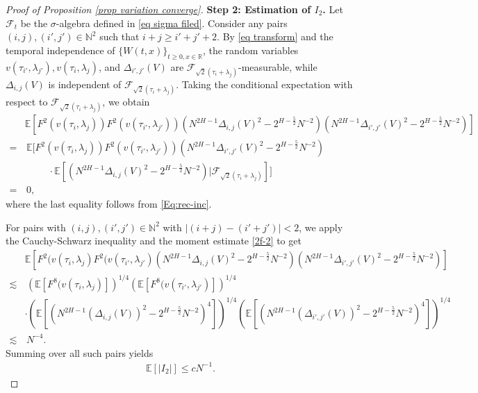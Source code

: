 \documentclass[11pt,reqno]{amsart}
\numberwithin{equation}{section}
\newcommand{\1}{{\bf 1}}
\newcommand{\2}{{\bf 2}}
\begin{document}
\begin{proof} [Proof of Proposition \ref{prop variation converge}]
\noindent\textbf{Step 2:  Estimation of  $I_2$.}
      Let $ \mathcal F_t$ be the   $\sigma$-algebra defined in \eqref{eq sigma filed}.  Consider any pairs $(i, j), (i', j')\in \mathbb N^2$  such that  $i+j\ge i'+j'+2$. By \eqref{eq transform} and  the temporal independence of  $\{W(t, x)\}_{t\ge0, x\in\mathbb R}$,    the random variables    $v(\tau_{i'}, \lambda_{j'}), v(\tau_i, \lambda_j)$,  and $\Delta_{i',j'}(V)$ are  $\mathcal F_{\sqrt{2}(\tau_i+\lambda_j)}$-measurable,   while  $\Delta_{i,j}(V)$   is independent of   $\mathcal F_{\sqrt{2}(\tau_i+\lambda_j)}$. Taking the conditional expectation with respect to    $\mathcal F_{\sqrt{2}(\tau_i+\lambda_j)}$, we obtain
    \begin{align*}
  & \mathbb E\left[   F^2(v(\tau_i, \lambda_j) )  F^2(v(\tau_{i'}, \lambda_{j'})) \left( N^{2H-1} \Delta_{i,j}(V)^2   -2^{H-\frac{5}{2}}N^{-2}\right)   \left( N^{2H-1}  \Delta_{i',j'}(V)^2   -2^{H-\frac{5}{2}}N^{-2}\right) \right]\\
   =&\, \mathbb E\Bigg[   F^2(v(\tau_i, \lambda_j) )  F^2(v(\tau_{i'}, \lambda_{j'}))     \left( N^{2H-1}  \Delta_{i',j'}(V)^2   - 2^{H-\frac{5}{2}}N^{-2}\right) \\
   &   \ \ \ \ \ \  \ \ \ \ \     \cdot  \mathbb E\left[  \left( N^{2H-1} \Delta_{i,j}(V)^2   -2^{H-\frac{5}{2}}N^{-2}\right)|\mathcal F_{\sqrt{2}(\tau_i+\lambda_j)}\right] \Bigg]  \\
   =& \, 0,
     \end{align*}
     where    the last equality follows from   \eqref{Eq:rec-inc}.
     
For pairs with   $(i, j), (i', j')\in \mathbb N^2$  with $|(i+j)-( i'+j')|<2$,  we apply      the  Cauchy-Schwarz  inequality and the moment estimate  \eqref{2f-2}  to get
       \begin{align*} 
& \mathbb E\left[   F^2(v(\tau_i, \lambda_j)   F^2(v(\tau_{i'}, \lambda_{j'})  \left( N^{2H-1} \Delta_{i,j}(V)^2   - 2^{H-\frac{5}{2}}N^{-2}\right) \left( N^{2H-1} \Delta_{i',j'}(V)^2   -2^{H-\frac{5}{2}}N^{-2}\right)    \right]\\
    \lesssim & \,   \left( \mathbb E\left[   F^8(v(\tau_i, \lambda_j) \right]\right)^{1/4 }  \left( \mathbb E\left[   F^8(v(\tau_{i'}, \lambda_{j'}) \right]\right)^{1/4 }  \\
 & \cdot   		\left(	\mathbb{E}\left[  \left( N^{2H-1} \left( \Delta_{i,j}(V) \right)^{2} -2^{H-\frac{5}{2}}N^{-2}\right) ^{4}\right] \right)^{1/4 } 
  \left(	\mathbb{E}\left[  \left( N^{2H-1} \left( \Delta_{i',j'}(V) \right)^{2} -2^{H-\frac{5}{2}}N^{-2}\right) ^{4}\right] \right)^{1/4 } \\
 \lesssim &\,    N^{-4}. 
      \end{align*}
Summing over all such pairs yields 
 \begin{align*}
\mathbb E [|I_2|]\le c N^{-1}.
  \end{align*} 
  

\end{proof}
\end{document}
